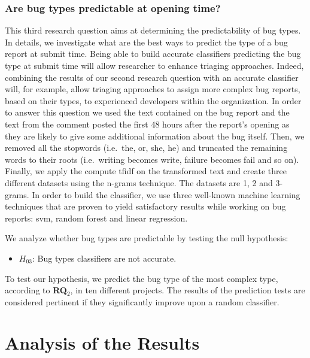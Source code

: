 \documentclass[natbib]{svjour3}
\providecommand{\tightlist}{%
  \setlength{\itemsep}{0pt}\setlength{\parskip}{0pt}}
\begin{document}
\subsubsection{Are bug types predictable at opening
time?}\label{are-bug-types-predictable-at-opening-time}

This third research question aims at determining the predictability of
bug types. In details, we investigate what are the best ways to predict
the type of a bug report at submit time. Being able to build accurate
classifiers predicting the bug type at submit time will allow researcher
to enhance triaging approaches. Indeed, combining the results of our
second research question with an accurate classifier will, for example,
allow triaging approaches to assign more complex bug reports, based on
their types, to experienced developers within the organization. In order
to answer this question we used the text contained on the bug report and
the text from the comment posted the first 48 hours after the report's
opening as they are likely to give some additional information about the
bug itself. Then, we removed all the stopwords (i.e.~the, or, she, he)
and truncated the remaining words to their roots (i.e.~writing becomes
write, failure becomes fail and so on). Finally, we apply the compute
tfidf on the transformed text and create three different datasets using
the n-grams technique. The datasets are 1, 2 and 3-grams. In order to
build the classifier, we use three well-known machine learning
techniques that are proven to yield satisfactory results while working
on bug reports: svm, random forest and linear regression.

We analyze whether bug types are predictable by testing the null
hypothesis:

\begin{itemize}
\tightlist
\item
  \(H_{03}\): Bug types classifiers are not accurate.
\end{itemize}

To test our hypothesis, we predict the bug type of the most complex
type, according to \textbf{RQ\(_2\)}, in ten different projects. The
results of the prediction tests are considered pertinent if they
significantly improve upon a random classifier.

\section{Analysis of the Results}\label{analysis-of-the-results}
\end{document}
